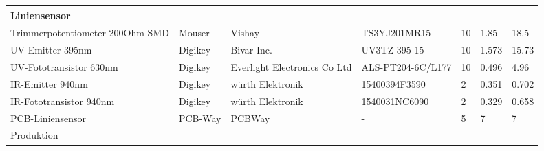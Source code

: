 \documentclass[main.tex]{subfiles} %
\begin{document}
\begin{table}[h]
{\begin{tabular}{|p{3cm}|p{2.5cm}|p{2.5cm}|p{3cm}|p{1cm}|p{1.5cm}|p{1cm}|}
        \rowcolor{lightgray} Liniensensor      &                        &                               &                                 &                     &                            &                                 \\ \hline
        Trimmerpotentiometer 200Ohm SMD        & Mouser                 & Vishay                        & TS3YJ201MR15                    & 10                  & 1.85                       & 18.5                           \\ \hline
        UV-Emitter 395nm                       & Digikey                & Bivar Inc.                    & UV3TZ-395-15                    & 10                  & 1.573                      & 15.73                           \\ \hline
        UV-Fototransistor 630nm                & Digikey                & Everlight Electronics Co Ltd  & ALS-PT204-6C/L177               & 10                  & 0.496                      & 4.96                           \\ \hline
        IR-Emitter 940nm                       & Digikey                & würth Elektronik              & 15400394F3590                   & 2                   & 0.351                      & 0.702                           \\ \hline
        IR-Fototransistor 940nm                & Digikey                & würth Elektronik              & 1540031NC6090                   & 2                   & 0.329                      & 0.658                           \\ \hline
        PCB-Liniensensor                       & PCB-Way                & PCBWay                        & -                               & 5                   & 7                          & 7                           \\ \hline
        \rowcolor{lightgray} Produktion        &                        &                               &                                 &                     &                            &                                 \\ \hline         

\end{tabular}}
\end{table}
\end{document}
